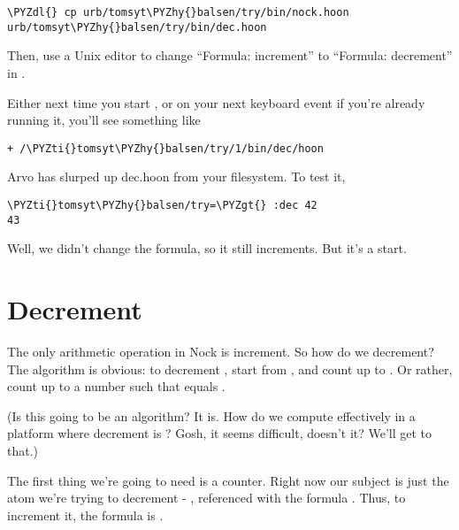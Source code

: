 \begin{framed_shaded}
\begin{Verbatim}[fontsize=\relsize{-2.5},commandchars=\\\{\}]
\PYZdl{} cp urb/tomsyt\PYZhy{}balsen/try/bin/nock.hoon urb/tomsyt\PYZhy{}balsen/try/bin/dec.hoon
\end{Verbatim}
\end{framed_shaded}
Then, use a Unix editor to change ``Formula: increment'' to
``Formula: decrement'' in .

Either next time you start , or on your next keyboard event
if you're already running it, you'll see something like

\begin{framed_shaded}
\begin{Verbatim}[fontsize=\relsize{-2.5},commandchars=\\\{\}]
 + /\PYZti{}tomsyt\PYZhy{}balsen/try/1/bin/dec/hoon
\end{Verbatim}
\end{framed_shaded}
Arvo has slurped up dec.hoon from your filesystem.  To test it,

\begin{framed_shaded}
\begin{Verbatim}[fontsize=\relsize{-2.5},commandchars=\\\{\}]
\PYZti{}tomsyt\PYZhy{}balsen/try=\PYZgt{} :dec 42
43
\end{Verbatim}
\end{framed_shaded}
Well, we didn't change the formula, so it still increments.  But
it's a start.

\section{Decrement}

The only arithmetic operation in Nock is increment.  So how do we
decrement?  The algorithm is obvious: to decrement , start
from , and count up to .  Or rather, count up to a number
 such that  equals .

(Is this going to be an  algorithm?  It is.  How do we
compute effectively in a platform where decrement is ?
Gosh, it seems difficult, doesn't it?  We'll get to that.)

The first thing we're going to need is a counter.  Right now
our subject is just the atom we're trying to decrement - ,
referenced with the formula \kode{[0 1]}.  Thus, to increment it,
the formula is \kode{[4 0 1]}.

